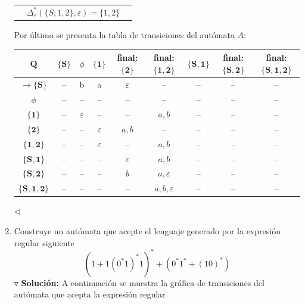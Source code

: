 \documentclass{article}
\begin{document}
\begin{enumerate}
\begin{center}
\begin{tabular}{ c  c  c }
      & $\Delta^{*}_{\varepsilon}\left(\{S,1,2\}, \varepsilon\right) = \{1,2\}$\\
    \end{tabular} 
  \end{center}
  Por último se presenta la tabla de transiciones del autómata $A$:
  \begin{center}
    \begin{tabular}{| c | c | c | c | c | c | c | c | c |}
      \hline
      $\mathbf{Q}$ & $\mathbf{\{S\}}$ & $\phi$ & $\mathbf{\{1\}}$ & final: $\mathbf{\{2\}}$ & final: $\mathbf{\{1,2\}}$ & $\mathbf{\{S,1\}}$ & final: $\mathbf{\{S,2\}}$ & final: $\mathbf{\{S, 1, 2\}}$\\ \hline
      $\rightarrow \mathbf{\{S\}}$ & -- & b & a & $\varepsilon$ & -- & -- & -- & -- \\ \hline
      $\phi$  & -- & -- & -- & -- & -- & --  & -- & -- \\ \hline
      $\mathbf{\{1\}}$  & -- & $\varepsilon$ & -- & -- & $a, b$ & --  & -- & -- \\\hline
      $\mathbf{\{2\}}$  & -- & -- & $\varepsilon$ & $a,b$ & -- & --  & -- & -- \\\hline
      $\mathbf{\{1,2\}}$  & -- & -- & $\varepsilon$ & -- & $a,b$ & -- & -- & -- \\\hline
      $\mathbf{\{S,1\}}$  & -- & -- & -- & $\varepsilon$ & $a,b$ & -- & -- & -- \\\hline
      $\mathbf{\{S,2\}}$  & -- & -- & -- & $b$ & $a, \varepsilon$ & -- & -- & --  \\\hline
      $\mathbf{\{S,1,2\}}$  & -- & -- & -- & -- & $a,b,\varepsilon$ & --  & -- & -- \\\hline
    \end{tabular} 
  \end{center}
  \hfill $\lhd$
\item Construye un autómata que acepte el lenguaje generado por la expresión regular siguiente
  \[
  (1 + 1(0^{*}1)^{*}1)^{*} + (0^{*}1^{*} + (10)^{*})
  \]
  $\triangledown$ \textbf{Solución:}
  A continuación se muestra la gráfica de transiciones del
  autómata que acepta la expresión regular
  \begin{center}
\end{center}
\end{enumerate}
\end{document}
